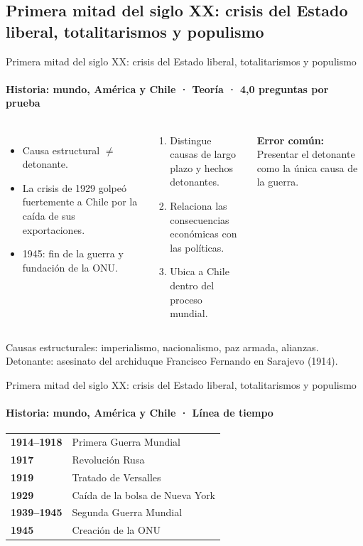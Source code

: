 \documentclass[aspectratio=169,11pt]{beamer}
\makeatletter
\newenvironment{lineatiempo}
  {\footnotesize\renewcommand{\arraystretch}{1.15}\begin{tabular}{@{}>{\leavevmode\bfseries\color{zinc700}}p{0.14\textwidth}p{0.74\textwidth}@{}}}
  {\end{tabular}}
\newlength{\ajustealto}
\newenvironment{ajustar}[1][0.74\textheight]
  {\setlength{\ajustealto}{#1}\begin{lrbox}{\ajustecaja}\begin{minipage}{\textwidth}}
  {\end{minipage}\end{lrbox}%
   \ifdim\dimexpr\ht\ajustecaja+\dp\ajustecaja\relax>\ajustealto
     \resizebox*{!}{\ajustealto}{\usebox{\ajustecaja}}\else\usebox{\ajustecaja}\fi}
\makeatother
\begin{document}
\subsection{Primera mitad del siglo XX: crisis del Estado liberal, totalitarismos y populismo}

\begin{frame}{Primera mitad del siglo XX: crisis del Estado liberal, totalitarismos y populismo}
\label{tema-hi-guerras}
\framesubtitle{Historia: mundo, América y Chile · Teoría · 4,0 preguntas por prueba}
\begin{ajustar}
\begin{columns}[T,onlytextwidth]
\begin{itemize}\footnotesize
\item Causa estructural $\neq$ detonante.
\item La crisis de 1929 golpeó fuertemente a Chile por la caída de sus exportaciones.
\item 1945: fin de la guerra y fundación de la ONU.
\end{itemize}
\begin{cajaregla}\scriptsize \begin{enumerate}\item Distingue causas de largo plazo y hechos detonantes.\item Relaciona las consecuencias económicas con las políticas.\item Ubica a Chile dentro del proceso mundial.\end{enumerate}\end{cajaregla}
\begin{notagris}\scriptsize \textbf{Error común:} Presentar el detonante como la única causa de la guerra.\end{notagris}
\end{columns}
\begin{cajaclave}\footnotesize
Causas estructurales: imperialismo, nacionalismo, paz armada, alianzas. Detonante: asesinato del archiduque Francisco Fernando en Sarajevo (1914).
\end{cajaclave}
\end{ajustar}
\end{frame}

\begin{frame}{Primera mitad del siglo XX: crisis del Estado liberal, totalitarismos y populismo}
\framesubtitle{Historia: mundo, América y Chile · Línea de tiempo}
\begin{lineatiempo}
1914–1918 & Primera Guerra Mundial \\
1917 & Revolución Rusa \\
1919 & Tratado de Versalles \\
1929 & Caída de la bolsa de Nueva York \\
1939–1945 & Segunda Guerra Mundial \\
1945 & Creación de la ONU \\
\end{lineatiempo}
\end{frame}
\end{document}

